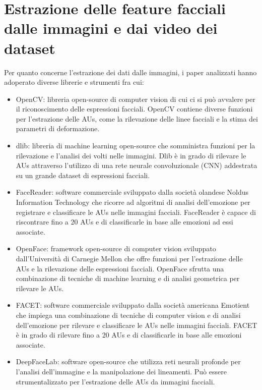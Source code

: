 \section{Estrazione delle feature facciali dalle immagini e dai video dei dataset}
Per quanto concerne l’estrazione dei dati dalle immagini, i paper analizzati hanno adoperato diverse librerie e strumenti fra cui:
\begin{itemize}
    \item OpenCV: libreria open-source di computer vision di cui ci si può avvalere per il riconoscimento delle espressioni facciali. OpenCV contiene diverse funzioni per l'estrazione delle AUs, come la rilevazione delle linee facciali e la stima dei parametri di deformazione.
    \item dlib: libreria di machine learning open-source che somministra funzioni per la rilevazione e l'analisi dei volti nelle immagini. Dlib è in grado di rilevare le AUs attraverso l'utilizzo di una rete neurale convoluzionale (CNN) addestrata su un grande dataset di espressioni facciali.
    \item FaceReader: software commerciale sviluppato dalla società olandese Noldus Information Technology che ricorre ad algoritmi di analisi dell'emozione per registrare e classificare le AUs nelle immagini facciali. FaceReader è capace di riscontrare fino a 20 AUs e di classificarle in base alle emozioni ad essi associate.
    \item OpenFace: framework open-source di computer vision sviluppato dall'Università di Carnegie Mellon che offre funzioni per l'estrazione delle AUs e la rilevazione delle espressioni facciali. OpenFace sfrutta una combinazione di tecniche di machine learning e di analisi geometrica per rilevare le AUs.
    \item FACET: software commerciale sviluppato dalla società americana Emotient che impiega una combinazione di tecniche di computer vision e di analisi dell'emozione per rilevare e classificare le AUs nelle immagini facciali. FACET è in grado di rilevare fino a 20 AUs e di classificarle in base alle emozioni associate.
    \item DeepFaceLab: software open-source che utilizza reti neurali profonde per l'analisi dell'immagine e la manipolazione dei lineamenti. Può essere strumentalizzato per l'estrazione delle AUs da immagini facciali.

\end{itemize}
